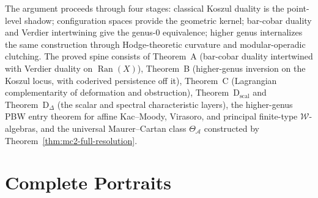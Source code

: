 \documentclass[11pt]{memoir}
\newcommand{\cA}{\mathcal{A}}
\begin{document}
The argument proceeds through four stages: classical Koszul duality is
the point-level shadow; configuration spaces provide the geometric
kernel; bar-cobar duality and Verdier intertwining give the genus-$0$
equivalence; higher genus internalizes the same construction through
Hodge-theoretic curvature and modular-operadic clutching.  The proved
spine consists of Theorem~A (bar-cobar duality intertwined with
Verdier duality on $\operatorname{Ran}(X)$), Theorem~B (higher-genus
inversion on the Koszul locus, with coderived persistence off it),
Theorem~C (Lagrangian complementarity of deformation and obstruction),
Theorem~D$_{\mathrm{scal}}$ and Theorem~D$_\Delta$ (the scalar and
spectral characteristic layers), the higher-genus PBW entry theorem
for affine Kac--Moody, Virasoro, and principal finite-type
$\mathcal{W}$-algebras, and the universal Maurer--Cartan class
$\Theta_{\cA}$ constructed by Theorem~\ref{thm:mc2-full-resolution}.



































\part{Complete Portraits}
\end{document}
